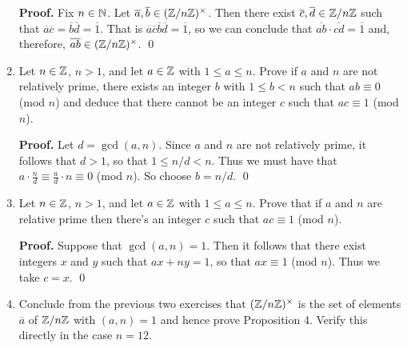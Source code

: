 \begin{enumerate}
      \textbf{Proof.} Fix $n \in \mathbb{N}$. Let
      $\overline{a}, \overline{b} \in (\mathbb{Z}/n\mathbb{Z})^\times$. Then there exist
      $\overline{c}, \overline{d} \in \mathbb{Z}/n\mathbb{Z}$ such that
      $\overline{a}\overline{c} = \overline{b}\overline{d} = \overline{1}$. That
      is $\overline{a}\overline{c}\overline{b}\overline{d} = \overline{1}$, so
      we can conclude that $\overline{ab}\cdot\overline{cd} = \overline{1}$ and,
      therefore, $\overline{ab} \in (\mathbb{Z}/n\mathbb{Z})^\times$. \qed
   \item[0.3.12]  Let $n \in \mathbb{Z}$, $n > 1$, and let $a \in \mathbb{Z}$ with
                  $1 \le a \le n$. Prove if $a$ and $n$ are not relatively
                  prime, there exists an integer $b$ with $1 \le b < n$ such
                  that $ab \equiv 0$ (mod $n$) and deduce that there cannot be
                  an integer $c$ such that $ac \equiv 1$ (mod $n$).

      \textbf{Proof.} Let $d = \gcd(a, n)$. Since $a$ and $n$ are not relatively
      prime, it follows that $d > 1$, so that $1 \le n/d < n$. Thus we must have 
      that $a \cdot \frac{n}{d} \equiv \frac{a}{d} \cdot n \equiv 0$ (mod $n$).
      So choose $b = n/d$. \qed
   \item[0.3.13]  Let $n \in \mathbb{Z}$, $n > 1$, and let $a \in \mathbb{Z}$ with
                  $1 \le a \le n$. Prove that if $a$ and $n$ are relative prime
                  then there's an integer $c$ such that $ac \equiv 1$ (mod $n$).

      \textbf{Proof.} Suppose that $\gcd(a, n) = 1$. Then it follows that there
      exist integers $x$ and $y$ such that $ax + ny = 1$, so that
      $ax \equiv 1$ (mod $n$). Thus we take $c = x$. \qed
   \item[0.3.14]  Conclude from the previous two exercises that
                  $(\mathbb{Z}/n\mathbb{Z})^\times$ is the set of elements $\overline{a}$ of
                  $\mathbb{Z}/n\mathbb{Z}$ with $(a, n) = 1$ and hence prove Proposition 4.
                  Verify this directly in the case $n = 12$.


\end{enumerate}
